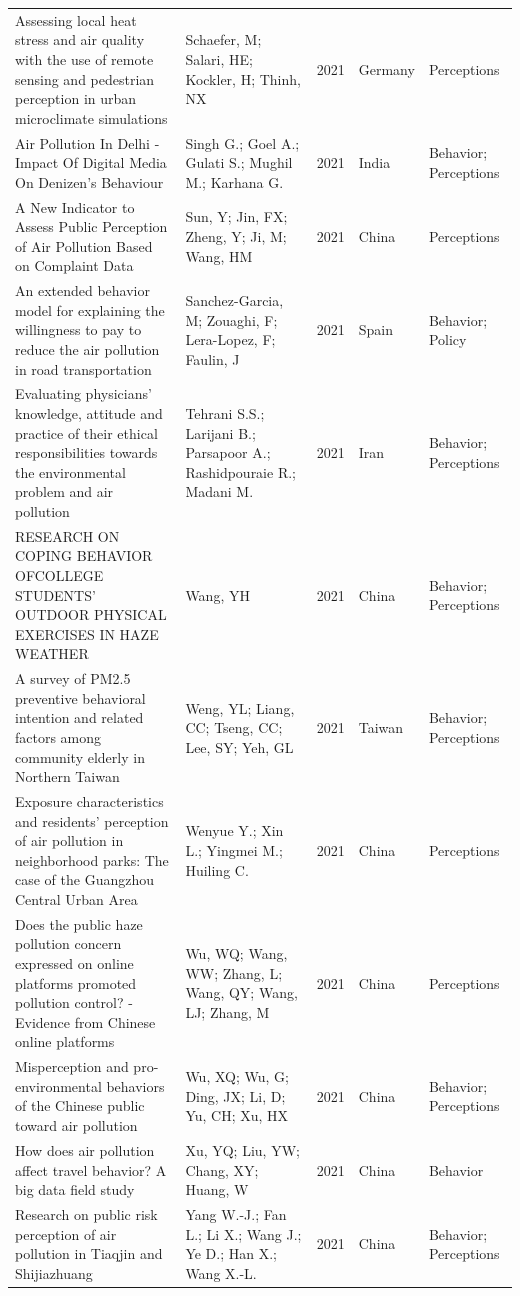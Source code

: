 {\begin{longtable}[t]{p{6cm}p{3cm}lp{3cm}p{3cm}}
Assessing local heat stress and air quality with the use of remote sensing and pedestrian perception in urban microclimate simulations & Schaefer, M; Salari, HE; Kockler, H; Thinh, NX & 2021 & Germany & Perceptions\\
Air Pollution In Delhi - Impact Of Digital Media On Denizen's Behaviour & Singh G.; Goel A.; Gulati S.; Mughil M.; Karhana G. & 2021 & India & Behavior; Perceptions\\
A New Indicator to Assess Public Perception of Air Pollution Based on Complaint Data & Sun, Y; Jin, FX; Zheng, Y; Ji, M; Wang, HM & 2021 & China & Perceptions\\
An extended behavior model for explaining the willingness to pay to reduce the air pollution in road transportation & Sanchez-Garcia, M; Zouaghi, F; Lera-Lopez, F; Faulin, J & 2021 & Spain & Behavior; Policy\\
\addlinespace
Evaluating physicians' knowledge, attitude and practice of their ethical responsibilities towards the environmental problem and air pollution & Tehrani S.S.; Larijani B.; Parsapoor A.; Rashidpouraie R.; Madani M. & 2021 & Iran & Behavior; Perceptions\\
RESEARCH ON COPING BEHAVIOR OFCOLLEGE STUDENTS' OUTDOOR PHYSICAL EXERCISES IN HAZE WEATHER & Wang, YH & 2021 & China & Behavior; Perceptions\\
A survey of PM2.5 preventive behavioral intention and related factors among community elderly in Northern Taiwan & Weng, YL; Liang, CC; Tseng, CC; Lee, SY; Yeh, GL & 2021 & Taiwan & Behavior; Perceptions\\
Exposure characteristics and residents' perception of air pollution in neighborhood parks: The case of the Guangzhou Central Urban Area & Wenyue Y.; Xin L.; Yingmei M.; Huiling C. & 2021 & China & Perceptions\\
Does the public haze pollution concern expressed on online platforms promoted pollution control? - Evidence from Chinese online platforms & Wu, WQ; Wang, WW; Zhang, L; Wang, QY; Wang, LJ; Zhang, M & 2021 & China & Perceptions\\
\addlinespace
Misperception and pro-environmental behaviors of the Chinese public toward air pollution & Wu, XQ; Wu, G; Ding, JX; Li, D; Yu, CH; Xu, HX & 2021 & China & Behavior; Perceptions\\
How does air pollution affect travel behavior? A big data field study & Xu, YQ; Liu, YW; Chang, XY; Huang, W & 2021 & China & Behavior\\
Research on public risk perception of air pollution in Tiaqjin and Shijiazhuang & Yang W.-J.; Fan L.; Li X.; Wang J.; Ye D.; Han X.; Wang X.-L. & 2021 & China & Behavior; Perceptions\\

\end{longtable}}
